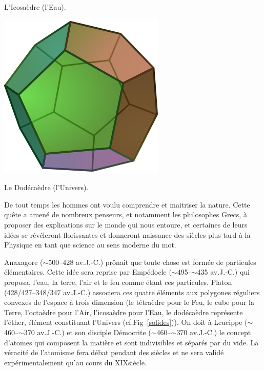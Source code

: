 {\vspace*{-0.25cm}
\begin{center}\normalfont\small {L'Icosaèdre (l'Eau).}\end{center}
\vspace*{-0.25cm}
\includegraphics[width=0.25\marginparwidth]{SM/Dodecahedron.png}
\vspace*{-0.25cm}
\begin{center}\normalfont\small {Le Dodécaèdre (l'Univers).}\end{center}
\vspace*{-0.25cm}
\label{solides}
}
De tout temps les hommes ont voulu comprendre et maitriser la nature. Cette quête a amené de nombreux penseurs, et notamment les philosophes Grecs, à proposer des explications sur le monde qui nous entoure, et certaines de leurs idées se révéleront florissantes et donneront naissance des siècles plus tard à la Physique en tant que science au sens moderne du mot. 

Anaxagore ($\sim$\num{500}--\num{428} av.J.-C.) prônait que toute chose est formée de particules élémentaires. Cette idée sera reprise par Empédocle ($\sim$\num{495}--$\sim$\num{435} av.J.-C.) qui proposa, l'eau, la terre, l'air et le feu comme étant ces particules. Platon (\num{428}/\num{427}--\num{348}/\num{347} av.J.-C.) associera ces quatre éléments aux polygones réguliers convexes de l'espace à trois dimension (le tétraèdre pour le Feu, le cube pour la Terre, l'octaèdre pour l'Air, l'icosaèdre pour l'Eau, le dodécaèdre représente l'éther, élément constituant l'Univers (cf.Fig~\ref{solides})). On doit à Leucippe ($\sim$\num{460}--$\sim$\num{370} av.J.-C.) et son disciple Démocrite ($\sim$\num{460}--$\sim$\num{370} av.J.-C.) le concept d'atomes qui composent la matière et sont indivisibles et séparés par du vide. La véracité de l'atomisme fera débat pendant des siècles et ne sera validé expérimentalement qu'au cours du XIX\ieme siècle.

